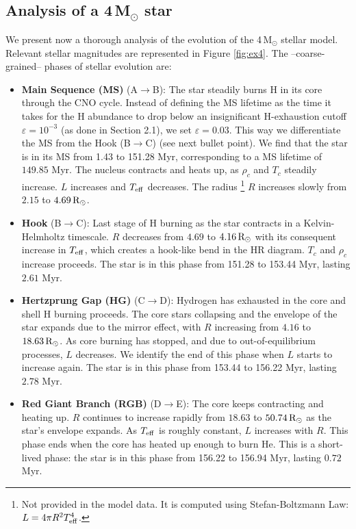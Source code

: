 \subsection{Analysis of a 4$\,$M$_\odot$ star}

We present now a thorough analysis of the evolution of the 4$\,$M$_\odot$ stellar model. Relevant stellar magnitudes are represented in Figure \ref{fig:ex4}. The --coarse-grained-- phases of stellar evolution are:
\begin{itemize}
    \item \textbf{Main Sequence (MS)} (A$\rightarrow$B): The star steadily burns H in its core through the CNO cycle. Instead of defining the MS lifetime as the time it takes for the H abundance to drop below an insignificant H-exhaustion cutoff $\varepsilon=10^{-3}$ (as done in Section 2.1), we set $\varepsilon=0.03$. This way we differentiate the MS from the Hook (B$\rightarrow$C) (see next bullet point). We find that the star is in its MS from 1.43 to 151.28 Myr, corresponding to a MS lifetime of $149.85$ Myr. The nucleus contracts and heats up, as $\rho_c$ and $T_c$ steadily increase. $L$ increases and $T_{\rm eff}$ decreases. The radius \footnote{Not provided in the model data. It is computed using Stefan-Boltzmann Law: $L=4\pi R^2 T_{\rm eff}^4$.} $R$ increases slowly from $2.15$ to $4.69 \, {\rm R}_\odot$.
    \item \textbf{Hook} (B$\rightarrow$C): Last stage of H burning as the star contracts in a Kelvin-Helmholtz timescale. $R$ decreases from $4.69$ to $4.16 \, {\rm R}_\odot$ with its consequent increase in $T_{\rm eff}$, which creates a hook-like bend in the HR diagram. $T_c$ and $\rho_c$ increase proceeds. The star is in this phase from 151.28 to 153.44 Myr, lasting $2.61$ Myr.
    \item \textbf{Hertzprung Gap (HG)} (C$\rightarrow$D): Hydrogen has exhausted in the core and shell H burning proceeds. The core stars collapsing and the envelope of the star expands due to the mirror effect, with $R$ increasing from $4.16$ to $18.63 \, {\rm R}_\odot$. As core burning has stopped, and due to out-of-equilibrium processes, $L$ decreases. We identify the end of this phase when $L$ starts to increase again. The star is in this phase from 153.44 to 156.22 Myr, lasting $2.78$ Myr.
    \item \textbf{Red Giant Branch (RGB)} (D$\rightarrow$E): The core keeps contracting and heating up. $R$ continues to increase rapidly from $18.63$ to $50.74 \, {\rm R}_\odot$ as the star's envelope expands. As $T_{\rm eff}$ is roughly constant, $L$ increases with $R$. This phase ends when the core has heated up enough to burn He. This is a short-lived phase: the star is in this phase from 156.22 to 156.94 Myr, lasting $0.72$ Myr.

\end{itemize}
